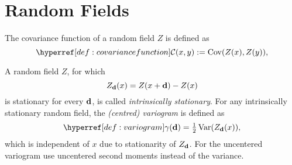 \section{Random Fields}

\begin{definition}\label{def: covariance function}
	The covariance function of a random field \(Z\) is defined as
	\begin{equation}
		\C(x,y):= \Cov(Z(x), Z(y)),
	\end{equation}
\end{definition}

\begin{definition}[Variogram]
	\label{def: variogram}
	A random field \(Z\), for which
	\[
		Z_{\mathbf{d}}(x) = Z(x+\mathbf{d})- Z(x)
	\]
	is stationary for every \(\mathbf{d}\), is called \emph{intrinsically stationary}.
	For any intrinsically stationary random field, the \emph{(centred) variogram} is
	defined as
	\[
		\variogram(\step)	= \tfrac12\Var(Z_\step(x)),
	\]
	which is independent of \(x\) due to stationarity of \(Z_{\mathbf{d}}\). For the
	uncentered variogram use uncentered second moments instead of the variance.
\end{definition}

